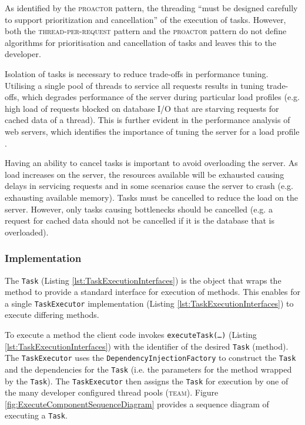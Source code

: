 \documentclass[prodmode]{style/acmlarge}
\begin{document}
As identified by the \textsc{proactor} pattern, the threading ``must be designed
carefully to support prioritization and cancellation'' \cite[p. 8]{proactor} of
the execution of tasks.  However, both the \textsc{thread-per-request} pattern and
the \textsc{proactor} pattern do not define algorithms for
prioritisation and cancellation of tasks and leaves this to the developer.

Isolation of tasks is necessary to reduce trade-offs in performance tuning. 
Utilising a single pool of threads to service all requests results in tuning
trade-offs, which degrades performance of the server during particular load
profiles (e.g. high load of requests blocked on database I/O that are starving
requests for cached data of a thread).  This is further evident in the
performance analysis of web servers, which identifies the importance of tuning
the server for a load profile
\cite{tuning-important,low-server-footprint,tuning-os-important}.

Having an ability to cancel tasks is important to avoid overloading the server.
As load increases on the server, the resources available will be exhausted
causing delays in servicing requests and in some scenarios cause the server to
crash (e.g. exhausting available memory).  Tasks must be cancelled to reduce the
load on the server.  However, only tasks causing bottlenecks should be cancelled
(e.g. a request for cached data should not be cancelled if it is the database
that is overloaded).


\subsubsection*{Implementation}

The \texttt{Task} (Listing \ref{lst:TaskExecutionInterfaces}) is the object that wraps
the method to provide a standard interface for execution of methods.  This
enables for a single \texttt{TaskExecutor} implementation (Listing
\ref{lst:TaskExecutionInterfaces}) to execute differing methods.

To execute a method the client code invokes \texttt{executeTask(\ldots)}
(Listing \ref{lst:TaskExecutionInterfaces}) with the identifier of the desired
\texttt{Task} (method).  The \texttt{TaskExecutor} uses the
\texttt{DependencyInjectionFactory} to construct the \texttt{Task}
and the dependencies for the \texttt{Task} (i.e. the parameters for the method
wrapped by the \texttt{Task}).  The \texttt{TaskExecutor} then assigns the
\texttt{Task} for execution by one of the many developer configured thread pools
(\textsc{team}).  Figure \ref{fig:ExecuteComponentSequenceDiagram} provides a
sequence diagram of executing a \texttt{Task}.
\end{document}
